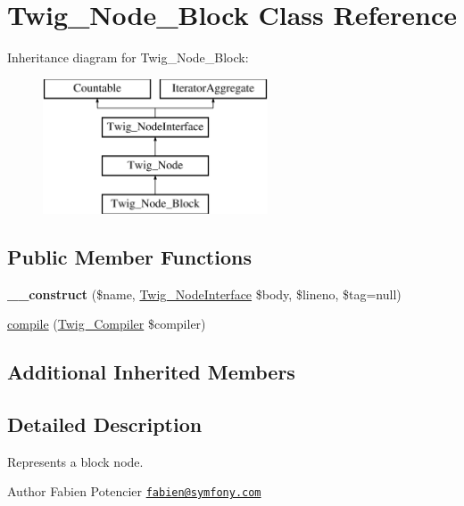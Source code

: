 \hypertarget{classTwig__Node__Block}{}\section{Twig\+\_\+\+Node\+\_\+\+Block Class Reference}
\label{classTwig__Node__Block}
Inheritance diagram for Twig\+\_\+\+Node\+\_\+\+Block\+:\begin{figure}[H]
\begin{center}
\leavevmode
\includegraphics[height=4.000000cm]{classTwig__Node__Block}
\end{center}
\end{figure}
\subsection*{Public Member Functions}
\begin{DoxyCompactItemize}
\item 
{\bfseries \+\_\+\+\_\+construct} (\$name, \hyperlink{interfaceTwig__NodeInterface}{Twig\+\_\+\+Node\+Interface} \$body, \$lineno, \$tag=null)\hypertarget{classTwig__Node__Block_aaa132abd0ea64a16fe60d0f2f725032e}{}\label{classTwig__Node__Block_aaa132abd0ea64a16fe60d0f2f725032e}

\item 
\hyperlink{classTwig__Node__Block_acdef30a7bb5ce187d63b35201bc179da}{compile} (\hyperlink{classTwig__Compiler}{Twig\+\_\+\+Compiler} \$compiler)
\end{DoxyCompactItemize}
\subsection*{Additional Inherited Members}


\subsection{Detailed Description}
Represents a block node.

\begin{DoxyAuthor}{Author}
Fabien Potencier \href{mailto:fabien@symfony.com}{\tt fabien@symfony.\+com} 
\end{DoxyAuthor}


